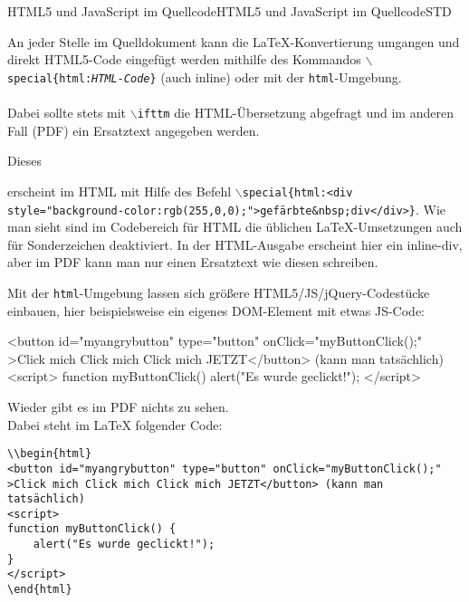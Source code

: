 \begin{MXContent}{HTML5 und JavaScript im Quellcode}{HTML5 und JavaScript im Quellcode}{STD}

\begin{MInfo}
An jeder Stelle im Quelldokument kann die LaTeX-Konvertierung umgangen und direkt HTML5-Code eingefügt werden
mithilfe des Kommandos \texttt{$\backslash$special\{html:\textit{HTML-Code}\}} (auch inline) oder mit der \texttt{html}-Umgebung.
\ \\ \ \\
Dabei sollte stets mit \texttt{$\backslash$ifttm} die HTML-Übersetzung abgefragt und im anderen Fall (PDF) ein Ersatztext angegeben werden.
\end{MInfo}

\begin{MExample}
\ifttm
Dieses  erscheint im HTML mit Hilfe
des Befehl \texttt{$\backslash$special\{html:<div style="background-color:rgb(255,0,0);{"}>gefärbte\&nbsp;div</div>\}}.
Wie man sieht sind im Codebereich für HTML die üblichen LaTeX-Umsetzungen auch für Sonderzeichen deaktiviert.
\else
In der HTML-Ausgabe erscheint hier ein inline-div, aber im PDF kann man nur einen Ersatztext wie diesen schreiben.
\fi
\end{MExample}

\begin{MExample}
Mit der \texttt{html}-Umgebung lassen sich größere HTML5/JS/jQuery-Codestücke einbauen, hier beispielsweise ein eigenes
DOM-Element mit etwas JS-Code:
\ \\
\ifttm
\begin{html}
<button id="myangrybutton" type="button" onClick="myButtonClick();" >Click mich Click mich Click mich JETZT</button> (kann man tatsächlich)
<script>
function myButtonClick() {
    alert("Es wurde geclickt!");
}
</script>
\end{html}
\else
Wieder gibt es im PDF nichts zu sehen.
\fi
\ \\
Dabei steht im LaTeX folgender Code:\\
\begin{verbatim}
\\begin{html}
<button id="myangrybutton" type="button" onClick="myButtonClick();" >Click mich Click mich Click mich JETZT</button> (kann man tatsächlich)
<script>
function myButtonClick() {
    alert("Es wurde geclickt!");
}
</script>
\end{html}
\end{verbatim}
\end{MExample}


\end{MXContent}
